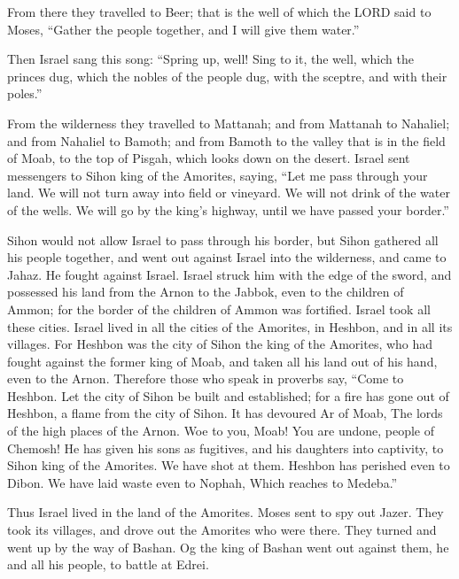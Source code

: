  From there they travelled to Beer; that is the well of
which the LORD said to Moses, ``Gather the people together, and I will
give them water.''

 Then Israel sang this song: ``Spring up, well! Sing to
it,  the well, which the princes dug, which the nobles of
the people dug, with the sceptre, and with their poles.''

From the wilderness they travelled to Mattanah;  and from
Mattanah to Nahaliel; and from Nahaliel to Bamoth;  and
from Bamoth to the valley that is in the field of Moab, to the top of
Pisgah, which looks down on the desert.  Israel sent
messengers to Sihon king of the Amorites, saying,  ``Let
me pass through your land. We will not turn away into field or vineyard.
We will not drink of the water of the wells. We will go by the king's
highway, until we have passed your border.''

 Sihon would not allow Israel to pass through his border,
but Sihon gathered all his people together, and went out against Israel
into the wilderness, and came to Jahaz. He fought against Israel.
 Israel struck him with the edge of the sword, and
possessed his land from the Arnon to the Jabbok, even to the children of
Ammon; for the border of the children of Ammon was fortified.
 Israel took all these cities. Israel lived in all the
cities of the Amorites, in Heshbon, and in all its villages.
 For Heshbon was the city of Sihon the king of the
Amorites, who had fought against the former king of Moab, and taken all
his land out of his hand, even to the Arnon.  Therefore
those who speak in proverbs say, ``Come to Heshbon. Let the city of
Sihon be built and established;  for a fire has gone out
of Heshbon, a flame from the city of Sihon. It has devoured Ar of Moab,
The lords of the high places of the Arnon.  Woe to you,
Moab! You are undone, people of Chemosh! He has given his sons as
fugitives, and his daughters into captivity, to Sihon king of the
Amorites.  We have shot at them. Heshbon has perished
even to Dibon. We have laid waste even to Nophah, Which reaches to
Medeba.''

 Thus Israel lived in the land of the Amorites.
 Moses sent to spy out Jazer. They took its villages, and
drove out the Amorites who were there.  They turned and
went up by the way of Bashan. Og the king of Bashan went out against
them, he and all his people, to battle at Edrei.

